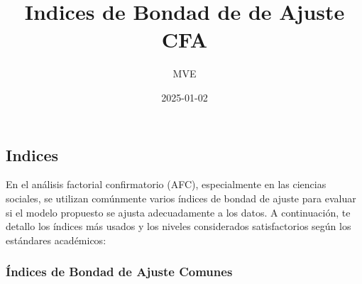 \documentclass[
]{article}
\title{Indices de Bondad de de Ajuste CFA}
\author{MVE}
\date{2025-01-02}
\begin{document}
\maketitle

\subsection{Indices}\label{indices}

En el análisis factorial confirmatorio (AFC), especialmente en las
ciencias sociales, se utilizan comúnmente varios índices de bondad de
ajuste para evaluar si el modelo propuesto se ajusta adecuadamente a los
datos. A continuación, te detallo los índices más usados y los niveles
considerados satisfactorios según los estándares académicos:

\subsubsection{\texorpdfstring{\textbf{Índices de Bondad de Ajuste
Comunes}}{Índices de Bondad de Ajuste Comunes}}\label{uxedndices-de-bondad-de-ajuste-comunes}
\end{document}
